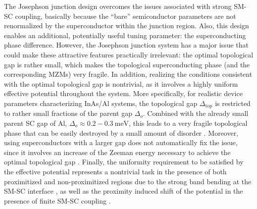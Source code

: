 \documentclass[twocolumn,aps,prb,nofootinbib]{revtex4-2}
\begin{document}
The Josephson junction design overcomes the issues associated with strong SM-SC coupling, basically because the  ``bare'' semiconductor parameters are not renormalized by the superconductor within the junction region. Also, this design enables an additional, potentially useful tuning parameter: the superconducting phase difference.
However, the Josephson junction system has a major issue that could make these attractive features practically irrelevant: the optimal topological gap is rather small, which makes the topological superconducting phase (and the corresponding MZMs) very fragile. In addition, realizing the conditions consistent with the optimal topological gap is  nontrivial, as it involves a highly uniform effective potential throughout the system. More specifically, for realistic device parameters characterizing InAs/Al systems, the topological gap $\Delta_{\text{top}}$ is restricted to rather small fractions of the parent gap $\Delta_o$. Combined with the already small parent SC gap of Al, $\Delta_o \approx 0.2-0.3~\text{meV}$, this leads to a very fragile  topological phase that can be easily destroyed by  a small amount of disorder \cite{Pan2020,Woods2021,Pan2021a}. 
Moreover, using superconductors with a larger gap does not automatically fix the issue, since it involves an increase of the Zeeman energy necessary to achieve the optimal topological gap \cite{Pientka2017}. Finally, the uniformity requirement to be satisfied by the effective potential represents a nontrivial task in the presence of both proximitized and non-proximitized regions \cite{Stenger2018} due to the strong band bending  at the SM-SC interface \cite{Woods2018,Winkler2019}, as well as the proximity induced shift of the potential in the presence of finite SM-SC coupling \cite{Stanescu2011,Reeg2018a}. 
\end{document}
